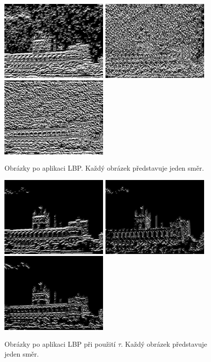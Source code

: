 \documentclass{report}
\begin{document}
\begin{figure}[H]
	\centering
	\includegraphics[width=150pt]{./img/lbp0.jpg}
	\includegraphics[width=150pt]{./img/lbp1.jpg}
	\includegraphics[width=150pt]{./img/lbp2.jpg}
	\caption{Obrázky po aplikaci LBP. Každý obrázek představuje jeden směr.}
\end{figure}

\begin{figure}[H]
	\centering
	\includegraphics[width=150pt]{./img/lbp0_tau.jpg}
	\includegraphics[width=150pt]{./img/lbp1_tau.jpg}
	\includegraphics[width=150pt]{./img/lbp2_tau.jpg}
	\caption{Obrázky po aplikaci LBP při použití $\tau$. Každý obrázek představuje jeden směr.}
\end{figure} 
\end{document}
